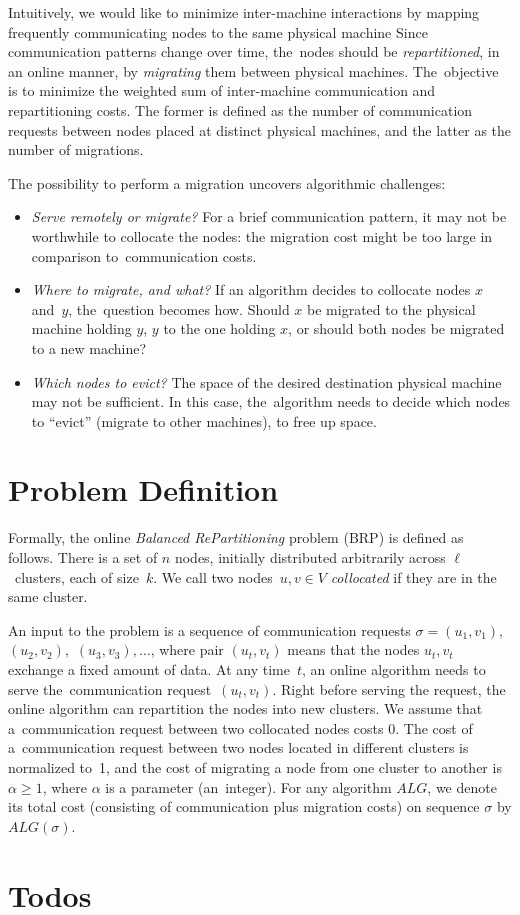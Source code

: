 \documentclass[manuscript,screen=true]{acmart}
\begin{document}
Intuitively, we would like to minimize inter-machine
interactions by mapping frequently communicating nodes to the same physical machine
Since communication patterns change over time, the~nodes should be \emph{repartitioned}, in
an online manner, by \emph{migrating} them between physical machines.
The~objective is to minimize the weighted sum of inter-machine communication and repartitioning costs.
The former is defined as the number of communication requests between nodes placed at distinct physical machines, and the latter as the number of migrations.


The possibility to perform a migration uncovers algorithmic challenges:
\begin{itemize}

\item \emph{Serve remotely or migrate?} For a brief communication
pattern, it may not be worthwhile to collocate the nodes: the migration cost might
be too large in comparison to~communication costs.

\item \emph{Where to migrate, and what?}
If an algorithm decides to collocate nodes $x$ and~$y$, the~question becomes
how. Should $x$ be migrated to the physical machine holding $y$, $y$ to the one holding
$x$, or should both nodes be migrated to a new machine?

\item \emph{Which nodes to evict?}
The space of the desired destination physical machine may not be sufficient. In
this case, the~algorithm needs to decide which nodes to ``evict'' (migrate to
other machines), to free up space.

\end{itemize}


\section{Problem Definition}


Formally, the online \emph{Balanced RePartitioning} problem (BRP) is defined as
follows. There is a set of $n$ nodes, initially distributed arbitrarily
across $\ell$~clusters, each of size~$k$. We call two nodes~$u,v\in V$
\emph{collocated} if they are in the same cluster.

An input to the problem is a sequence of communication requests $\sigma =
(u_1,v_1),$ $(u_2,v_2),$ $(u_3,v_3), \ldots$, where pair $(u_t,v_t)$ means that
the nodes $u_t,v_t$ exchange a fixed amount of data.  At any time~$t$, an online algorithm needs to serve the~communication
request~$(u_t,v_t)$. Right before serving the request, the online algorithm
can repartition the nodes into new clusters. We assume that
a~communication request between two collocated nodes costs 0. The cost of a~communication request between two nodes located in different clusters is
normalized to~1, and the cost of migrating a node from one cluster to another
is~$\alpha \geq 1$, where $\alpha$ is a parameter (an~integer). For any
algorithm $ALG$, we denote its total cost (consisting of communication plus
migration costs) on sequence $\sigma$ by $ALG(\sigma)$.

\section{Todos}




  

    
\end{document}
